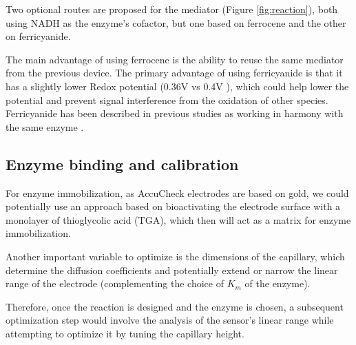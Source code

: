 \documentclass[conference]{IEEEtran}
\begin{document}

Two optional routes are proposed for the mediator (Figure \ref{fig:reaction}), both using NADH as the enzyme's cofactor, but one based on ferrocene and the other on ferricyanide.

The main advantage of using ferrocene is the ability to reuse the same mediator from the previous device. The primary advantage of using ferricyanide is that 
it has a slightly lower Redox potential (0.36V vs 0.4V \cite{cheahElectrochemicalOxidationFerricyanide2021}), which could help lower the potential and prevent 
signal interference from the oxidation of other species. Ferricyanide has been described in previous studies as working in harmony with the same enzyme \cite{nikolausAmperometricLactateBiosensors2008}.


\subsection{Enzyme binding and calibration}

For enzyme immobilization, as AccuCheck electrodes are based on gold\cite{TestStripFaq}, we could potentially use an approach based on bioactivating 
the electrode surface with a monolayer of thioglycolic acid (TGA), which then will act as a matrix for enzyme immobilization.

Another important variable to optimize is the dimensions of the capillary, which determine 
the diffusion coefficients and potentially extend or narrow the linear range of the electrode (complementing the choice of \(K_m\) of the enzyme). 

Therefore, once the reaction is designed and the enzyme is chosen, a subsequent optimization step would involve the analysis of the sensor's 
linear range while attempting to optimize it by tuning the capillary height.
\end{document}
